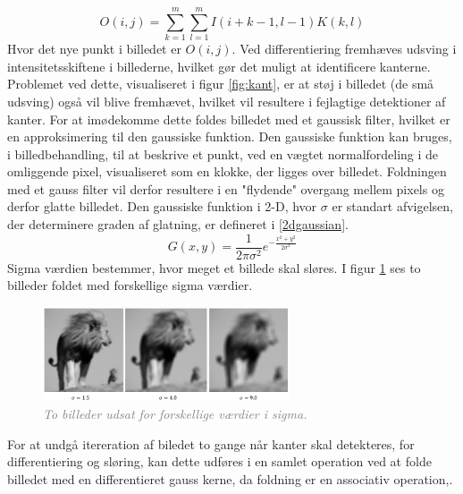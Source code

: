 \begin{equation}
O(i,j) = \sum\limits_{k=1}^m \sum\limits_{l=1}^m I(i+k-1,l-1)K(k,l)
\end{equation}
Hvor det nye punkt i billedet er $O(i,j)$. Ved differentiering fremhæves udsving i intensitetsskiftene i billederne, hvilket gør det muligt at identificere kanterne. Problemet ved dette, visualiseret i figur \ref{fig:kant}, er at støj i billedet (de små udsving) også vil blive fremhævet, hvilket vil resultere i fejlagtige detektioner af kanter. For at imødekomme dette foldes billedet med et gaussisk filter, hvilket er en approksimering til den gaussiske funktion. Den gaussiske funktion kan bruges, i billedbehandling, til at beskrive et punkt, ved en vægtet normalfordeling i de omliggende pixel, visualiseret som en klokke, der ligges over billedet. Foldningen med et gauss filter vil derfor resultere i en "flydende" overgang mellem pixels og derfor glatte billedet.  Den gaussiske funktion i 2-D, hvor $ \sigma $ er standart afvigelsen, der determinere graden af glatning, er defineret i \eqref{2dgaussian}.
\begin{equation}
G(x,y) = \frac{1}{2 \pi \sigma ^{2}} e^{- \frac{x^{2} + y^{2}}{2 \sigma ^{2}}}
\label{2dgaussian}
\end{equation}
Sigma værdien bestemmer, hvor meget et billede skal sløres. I figur \ref{fig:sigma} ses to billeder foldet med forskellige sigma værdier.
\begin{figure}[H]
    \centering
    \includegraphics[width=0.65\textwidth]{fig/14.png}
    \vspace{-1em}
    \begin{center}    
    \caption{\textcolor{gray}{\footnotesize \textit{
     To billeder udsat for forskellige værdier i sigma.}}}     
    \label{fig:sigma}
    \vspace{-2.5em}
     \end{center}
\end{figure}
\noindent
For at undgå itereration af biledet to gange når kanter skal detekteres, for differentiering og sløring, kan dette udføres i en samlet operation ved at folde billedet med en differentieret gauss kerne, da foldning er en associativ operation,.
